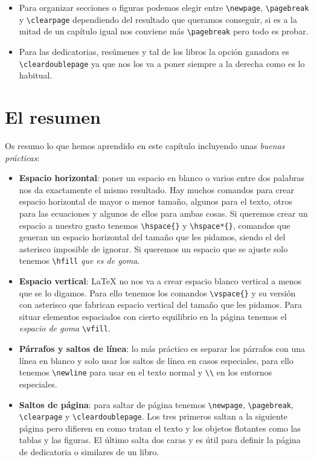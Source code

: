\begin{itemize}
\item
  Para organizar secciones o figuras podemos elegir entre
  \lstinline!\newpage!, \lstinline!\pagebreak! y \lstinline!\clearpage!
  dependiendo del resultado que queramos conseguir, si es a la mitad de
  un capítulo igual nos conviene más \lstinline!\pagebreak! pero todo es
  probar.
\item
  Para las dedicatorias, resúmenes y tal de los libros la opción
  ganadora es \lstinline!\cleardoublepage! ya que nos los va a poner
  siempre a la derecha como es lo habitual.
\end{itemize}

\section{El resumen}\label{el-resumen}

Os resumo lo que hemos aprendido en este capítulo incluyendo unas
\emph{buenas prácticas}:

\begin{itemize}
\item
  \textbf{Espacio horizontal}: poner un espacio en blanco o varios entre
  dos palabras nos da exactamente el mismo resultado. Hay muchos
  comandos para crear espacio horizontal de mayor o menor tamaño,
  algunos para el texto, otros para las ecuaciones y algunos de ellos
  para ambas cosas. Si queremos crear un espacio a nuestro gusto tenemos
  \lstinline!\hspace{}! y \lstinline!\hspace*{}!, comandos que generan
  un espacio horizontal del tamaño que les pidamos, siendo el del
  asterisco imposible de ignorar. Si queremos un espacio que se ajuste
  solo tenemos \lstinline!\hfill! \emph{que es de goma}.
\item
  \textbf{Espacio vertical}: LaTeX no nos va a crear espacio blanco
  vertical a menos que se lo digamos. Para ello tenemos los comandos
  \lstinline!\vspace{}! y su versión con asterisco que fabrican espacio
  vertical del tamaño que les pidamos. Para situar elementos espaciados
  con cierto equilibrio en la página tenemos el \emph{espacio de goma}
  \lstinline!\vfill!.
\item
  \textbf{Párrafos y saltos de línea}: lo más práctico es separar los
  párrafos con una línea en blanco y solo usar los saltos de línea en
  casos especiales, para ello tenemos \lstinline!\newline! para usar en
  el texto normal y \lstinline!\\! en los entornos especiales.
\item
  \textbf{Saltos de página}: para saltar de página tenemos
  \lstinline!\newpage!, \lstinline!\pagebreak!, \lstinline!\clearpage! y
  \lstinline!\cleardoublepage!. Los tres primeros saltan a la siguiente
  página pero difieren en como tratan el texto y los objetos flotantes
  como las tablas y las figuras. El último salta dos caras y es útil
  para definir la página de dedicatoria o similares de un libro.
\end{itemize}

